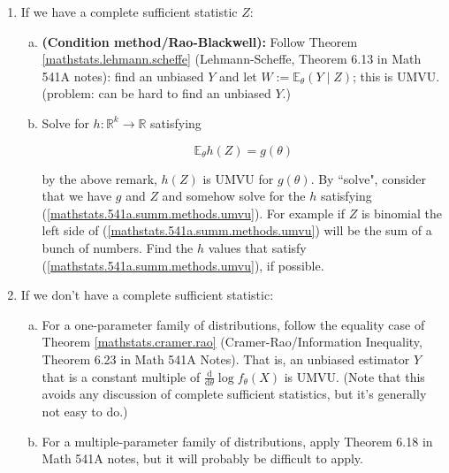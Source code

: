 \documentclass{article}
\newcommand{\deriv}[2]{\frac{\mathrm{d} #1}{\mathrm{d} #2}}
\newcommand{\E}{\mathbb{E}}
\theoremstyle{definition}
\theoremstyle{definition}
\theoremstyle{definition}
\theoremstyle{definition}
\theoremstyle{definition}
\theoremstyle{definition}
\theoremstyle{definition}
\begin{document}
\begin{enumerate}[(1)]

\item If we have a complete sufficient statistic \(Z\):

\begin{enumerate}[(a)]

\item \textbf{(Condition method/Rao-Blackwell):} Follow Theorem \ref{mathstats.lehmann.scheffe} (Lehmann-Scheffe, Theorem 6.13 in Math 541A notes): find an unbiased \(Y\) and let \(W:= \E_\theta(Y \mid Z)\); this is UMVU. (problem: can be hard to find an unbiased \(Y\).)

\item Solve for \(h: \mathbb{R}^k \to \mathbb{R}\) satisfying

 \begin{equation}\label{mathstats.541a.summ.methods.umvu}
\E_\theta h(Z) = g(\theta)
\end{equation}

by the above remark, \(h(Z)\) is UMVU for \(g(\theta)\). By ``solve", consider that we have \(g\) and \(Z\) and somehow solve for the \(h\) satisfying (\ref{mathstats.541a.summ.methods.umvu}). For example if \(Z\) is binomial the left side of (\ref{mathstats.541a.summ.methods.umvu}) will be the sum of a bunch of numbers. Find the \(h\) values that satisfy (\ref{mathstats.541a.summ.methods.umvu}), if possible.


\end{enumerate}

\item If we don't have a complete sufficient statistic:

\begin{enumerate}[(a)]

\item For a one-parameter family of distributions, follow the equality case of Theorem \ref{mathstats.cramer.rao} (Cramer-Rao/Information Inequality, Theorem 6.23 in Math 541A Notes). That is, an unbiased estimator \(Y\) that is a constant multiple of \(\deriv{}{\theta}  \log f_\theta (X) \) is UMVU. (Note that this avoids any discussion of complete sufficient statistics, but it's generally not easy to do.)

\item For a multiple-parameter family of distributions, apply Theorem 6.18 in Math 541A notes, but it will probably be difficult to apply.


\end{enumerate}

\end{enumerate}
\end{document}

